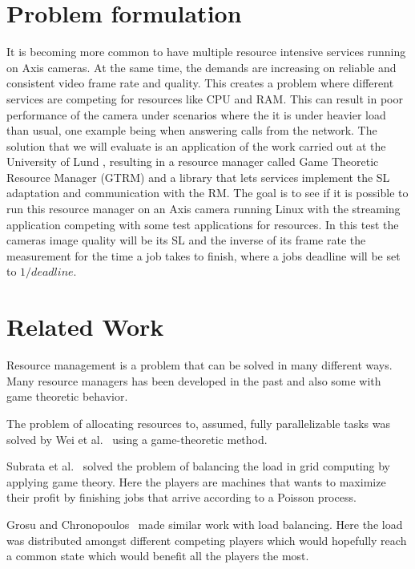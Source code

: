 \documentclass[nobiblatex]{LTHthesis}
\newcommand{\martina}[1]{\todo[inline,color=red!30,caption={}]{\textbf{Martina:} #1}}
\begin{document}
\section{Problem formulation}
It is becoming more common to have multiple resource intensive services running on Axis cameras. At the same time, the demands are increasing on reliable and consistent video frame rate and quality. This creates a problem where different services are competing for resources like CPU and RAM. This can result in poor performance of the camera under scenarios where the it is under heavier load than usual, one example being when answering calls from the network. The solution that we will evaluate is an application of the work carried out at the University of Lund \cite{gtrm}, resulting in a resource manager called Game Theoretic Resource Manager (GTRM) and a library that lets services implement the SL adaptation and communication with the RM. The goal is to see if it is possible to run this resource manager on an Axis camera running Linux with the streaming application competing with some test applications for resources. In this test the cameras image quality will be its SL and the inverse of its frame rate the measurement for the time a job takes to finish, where a jobs deadline will be set to \(1/deadline\).



\section{Related Work}

\martina{Rephrase this}

Resource management is a problem that can be solved in many different ways. Many resource managers has been developed in the past and also some with game theoretic behavior.  

The problem of allocating resources to, assumed, fully parallelizable tasks was solved by Wei et al.~\cite{Wei10} using a game-theoretic method.

Subrata et al.~\cite{Sub08} solved the problem of balancing the load in grid computing by applying game theory. Here the players are machines that wants to maximize their profit by finishing jobs that arrive according to a Poisson process.

Grosu and
Chronopoulos~\cite{Gro05} made similar work with load balancing. Here the load was distributed amongst different competing players which would hopefully reach a common state which would benefit all the players the most.
\end{document}
